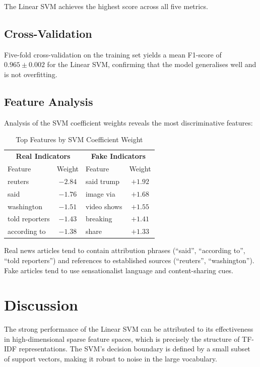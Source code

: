 \documentclass[conference]{IEEEtran}
\begin{document}
The Linear SVM achieves the highest score across all five metrics.

\subsection{Cross-Validation}

Five-fold cross-validation on the training set yields a mean F1-score of $0.965 \pm 0.002$ for the Linear SVM, confirming that the model generalises well and is not overfitting.

\subsection{Feature Analysis}

Analysis of the SVM coefficient weights reveals the most discriminative features:

\begin{table}[ht]
\centering
\caption{Top Features by SVM Coefficient Weight}
\begin{tabular}{lc|lc}
\toprule
\multicolumn{2}{c|}{\textbf{Real Indicators}} & \multicolumn{2}{c}{\textbf{Fake Indicators}} \\
Feature & Weight & Feature & Weight \\
\midrule
reuters & $-2.84$ & said trump & $+1.92$ \\
said & $-1.76$ & image via & $+1.68$ \\
washington & $-1.51$ & video shows & $+1.55$ \\
told reporters & $-1.43$ & breaking & $+1.41$ \\
according to & $-1.38$ & share & $+1.33$ \\
\bottomrule
\end{tabular}
\label{tab:features}
\end{table}

Real news articles tend to contain attribution phrases (``said'', ``according to'', ``told reporters'') and references to established sources (``reuters'', ``washington''). Fake articles tend to use sensationalist language and content-sharing cues.

\section{Discussion}

The strong performance of the Linear SVM can be attributed to its effectiveness in high-dimensional sparse feature spaces, which is precisely the structure of TF-IDF representations. The SVM's decision boundary is defined by a small subset of support vectors, making it robust to noise in the large vocabulary.
\end{document}

